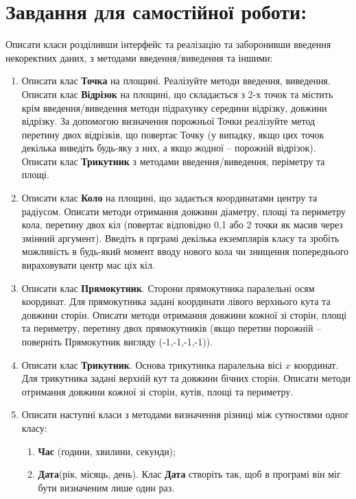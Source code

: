 \documentclass[a5paper,titlepage,openany,twoside,draft]{book_unv}%
\makeatletter
\newcommand{\xslalph}[1]{\expandafter\@xslalph\csname c@#1\endcsname}
\newcommand{\@xslalph}[1]{%
    \ifcase#1\or а\or б\or в\or г\or д\or e\or є\or ж\or з\or i%
    \or й\or к\or л\or м\or н\or о\or п\or р\or с\or т%
    \or у\or ф\or х\or ц\or ч\or ш\or ю\or я\or аа\or бб\or вв%
    \else\@ctrerr\fi%
}
\makeatother
\begin{document}
\section{Завдання для самостійної роботи:}

Описати класи розділивши інтерфейс та реалізацію та заборонивши введення
некоректних даних, з методами введення/виведення та іншими:

\begin{enumerate}
\def\labelenumi{\arabic{enumi})}
\setcounter{enumi}{3}
\item
  Описати клас \textbf{Точка} на площині. Реалізуйте методи введення,
  виведення. Описати клас \textbf{Відрізок} на площині, що складається
  з 2-х точок та містить крім введення/виведення методи підрахунку
  середини відрізку, довжини відрізку. За допомогою визначення
  порожньої Точки реалізуйте метод перетину двох відрізків, що повертає
  Точку (у випадку, якщо цих точок декілька виведіть будь-яку з них, а
  якщо жодної -- порожній відрізок). Описати клас \textbf{Трикутник} з 
  методами введення/виведення, періметру та площі.
 
\item
  Описати клас \textbf{Коло} на площині, що задається координатами
  центру та радіусом. Описати методи отримання довжини діаметру, площі
  та периметру кола, перетину двох кіл (повертає відповідно 0,1 або 2
  точки як масив через змінний аргумент). Введіть в прграмі декілька
екземплярів класу та зробіть можливість в будь-який момент вводу нового кола
чи знищення попереднього вираховувати центр мас ціх кіл.

\item
  Описати клас \textbf{Прямокутник}. Сторони прямокутника паралельні
  осям координат. Для прямокутника задані координати лівого верхнього
  кута та довжини сторін. Описати методи отримання довжини кожної зі
  сторін, площі та периметру, перетину двох прямокутників (якщо перетин
  порожній -- поверніть Прямокутник вигляду (-1,-1,-1,-1)).
\item
  Описати клас \textbf{Трикутник}. Основа трикутника паралельна вісі
  $x$ координат. Для трикутника задані верхній кут та довжини
  бічних сторін. Описати методи отримання довжини кожної зі сторін, кутів,
  площі та периметру.

\item
  Описати наступні класи з методами визначення різниці між сутностями
одног класу:
\begin{enumerate}[label=\xslalph*)]
\item \textbf{Час} (години, хвилини, секунди);
\item \textbf{Дата}(рік, місяць, день).
Клас \textbf{Дата} створіть так, щоб в програмі він міг бути визначеним лише один раз. 
\end{enumerate}


\end{enumerate}
\end{document}
